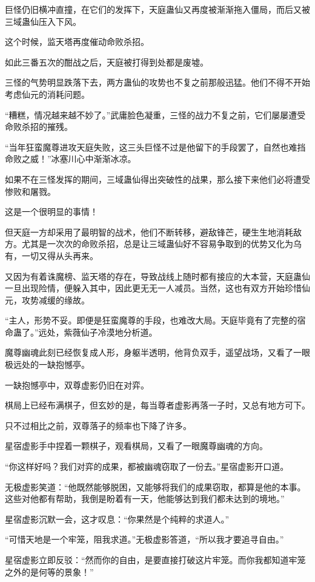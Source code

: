 \begin{this_body}
巨怪仍旧横冲直撞，在它们的发挥下，天庭蛊仙又再度被渐渐拖入僵局，而后又被三域蛊仙压入下风。

这个时候，监天塔再度催动命败杀招。

如此三番五次的酣战之后，天庭被打得到处都是废墟。

三怪的气势明显跌落下去，两方蛊仙的攻势也不复之前那般迅猛。他们不得不开始考虑仙元的消耗问题。

“糟糕，情况越来越不妙了。”武庸脸色凝重，三怪的战力不复之前，它们屡屡遭受命败杀招的摧残。

“当年狂蛮魔尊进攻天庭失败，这三头巨怪不过是他留下的手段罢了，自然也难挡命败之威！”冰塞川心中渐渐冰凉。

如果不在三怪发挥的期间，三域蛊仙得出突破性的战果，那么接下来他们必将遭受惨败和屠戮。

这是一个很明显的事情！

但天庭一方却采用了最明智的战术，他们不断转移，避敌锋芒，硬生生地消耗敌方。尤其是一次次的命败杀招，总是让三域蛊仙好不容易争取到的优势又化为乌有，一切又得从头再来。

又因为有着诛魔榜、监天塔的存在，导致战线上随时都有接应的大本营，天庭蛊仙一旦出现险情，便躲入其中，因此更无无一人减员。当然，这也有双方开始珍惜仙元，攻势减缓的缘故。

“主人，形势不妥。即便是狂蛮魔尊的手段，也难改大局。天庭毕竟有了完整的宿命蛊了。”远处，紫薇仙子冷漠地分析道。

魔尊幽魂此刻已经恢复成人形，身躯半透明，他背负双手，遥望战场，又看了一眼极远处的一缺抱憾亭。

一缺抱憾亭中，双尊虚影仍旧在对弈。

棋局上已经布满棋子，但玄妙的是，每当尊者虚影再落一子时，又总有地方可下。

只不过相比之前，双尊落子的频率也下降了许多。

星宿虚影手中捏着一颗棋子，观看棋局，又看了一眼魔尊幽魂的方向。

“你这样好吗？我们对弈的成果，都被幽魂窃取了一份去。”星宿虚影开口道。

无极虚影笑道：“他既然能够脱困，又能够将我们的成果窃取，都算是他的本事。这些对他都有帮助，我倒是盼着有一天，他能够达到我们都未达到的境地。”

星宿虚影沉默一会，这才叹息：“你果然是个纯粹的求道人。”

“可惜天地是一个牢笼，阻我求道。”无极虚影答道，“所以我才要追寻自由。”

星宿虚影立即反驳：“然而你的自由，是要直接打破这片牢笼。而你我都知道牢笼之外的是何等的景象！”


\end{this_body}
